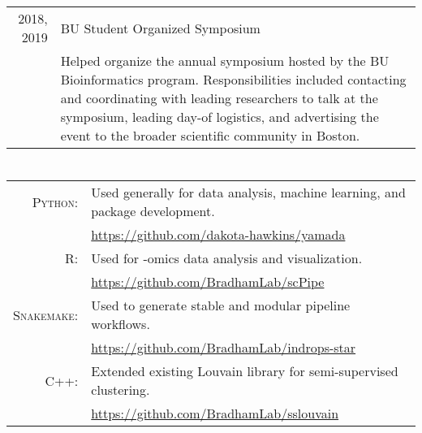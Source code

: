 \documentclass[a4paper,10pt]{article}
\begin{document}
\begin{tabular}{rp{10cm}}
	2018, 2019
	 & BU Student Organized Symposium                                                                                                                           \\
	 & \footnotesize{Helped organize the annual symposium hosted by the BU
		Bioinformatics program. Responsibilities included contacting and
		coordinating with leading researchers to talk at the symposium,
		leading day-of logistics, and advertising the event to the broader
	scientific community in Boston.}                                                                                                                            \\
\end{tabular}

\section{\color{linkcolour}{Programming Languages}}
\begin{tabular}{rl}
	\textsc{Python:}    & Used generally for data analysis, machine learning, and package development.                          \\
	                    & \small{\href{https://github.com/dakota-hawkins/yamada}{https://github.com/dakota-hawkins/yamada}}     \\
	\textsc{R:}         & Used for -omics data analysis and visualization.                                                      \\
	                    & \small{\href{https://github.com/BradhamLab/scPipe}{https://github.com/BradhamLab/scPipe}}             \\
	\textsc{Snakemake:} & Used to generate stable and modular pipeline workflows.                                               \\
	                    & \small{\href{https://github.com/BradhamLab/indrops-star}{https://github.com/BradhamLab/indrops-star}} \\
	\textsc{C++:}       & Extended existing Louvain library for semi-supervised clustering.                                     \\
	                    & \small{\href{https://github.com/BradhamLab/sslouvain}{https://github.com/BradhamLab/sslouvain}}       \\
\end{tabular}
\end{document}
